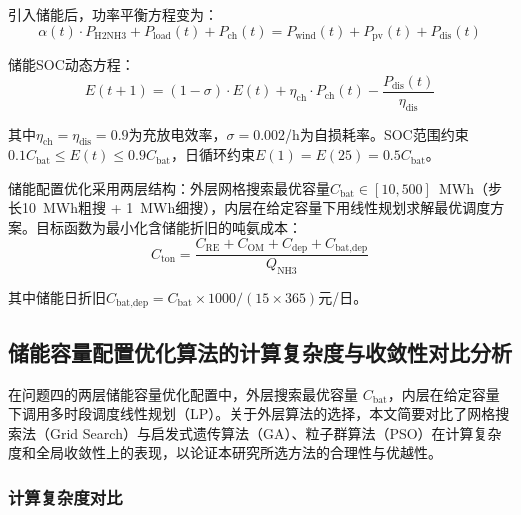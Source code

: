 引入储能后，功率平衡方程变为：
\begin{equation}
\alpha(t) \cdot P_{\text{H2NH3}} + P_{\text{load}}(t) + P_{\text{ch}}(t) = P_{\text{wind}}(t) + P_{\text{pv}}(t) + P_{\text{dis}}(t)
\end{equation}

储能SOC动态方程：
\begin{equation}
E(t+1) = (1 - \sigma) \cdot E(t) + \eta_{\text{ch}} \cdot P_{\text{ch}}(t) - \frac{P_{\text{dis}}(t)}{\eta_{\text{dis}}}
\end{equation}

其中$\eta_{\text{ch}} = \eta_{\text{dis}} = 0.9$为充放电效率，$\sigma = 0.002$/h为自损耗率。SOC范围约束$0.1 C_{\text{bat}} \leq E(t) \leq 0.9 C_{\text{bat}}$，日循环约束$E(1) = E(25) = 0.5 C_{\text{bat}}$。

储能配置优化采用两层结构\cite{ref8}：外层网格搜索最优容量$C_{\text{bat}} \in [10, 500]$~MWh（步长10~MWh粗搜 + 1~MWh细搜），内层在给定容量下用线性规划求解最优调度方案。目标函数为最小化含储能折旧的吨氨成本：
\begin{equation}
C_{\text{ton}} = \frac{C_{\text{RE}} + C_{\text{OM}} + C_{\text{dep}} + C_{\text{bat,dep}}}{Q_{\text{NH3}}}
\end{equation}

其中储能日折旧$C_{\text{bat,dep}} = C_{\text{bat}} \times 1000 / (15 \times 365)$元/日。

\subsection{储能容量配置优化算法的计算复杂度与收敛性对比分析}

在问题四的两层储能容量优化配置中，外层搜索最优容量 $C_{\text{bat}}$，内层在给定容量下调用多时段调度线性规划（LP）。关于外层算法的选择，本文简要对比了网格搜索法（Grid Search）与启发式遗传算法（GA）、粒子群算法（PSO）在计算复杂度和全局收敛性上的表现，以论证本研究所选方法的合理性与优越性。

\subsubsection{计算复杂度对比}

